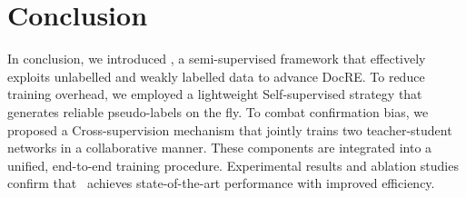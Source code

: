 \section{Conclusion}
In conclusion, we introduced \model, a semi-supervised framework that effectively exploits unlabelled and weakly labelled data to advance DocRE. To reduce training overhead, we employed a lightweight Self-supervised strategy that generates reliable pseudo-labels on the fly. To combat confirmation bias, we proposed a Cross-supervision mechanism that jointly trains two teacher-student networks in a collaborative manner. These components are integrated into a unified, end-to-end training procedure. Experimental results and ablation studies confirm that \model\ achieves state-of-the-art performance with improved efficiency.